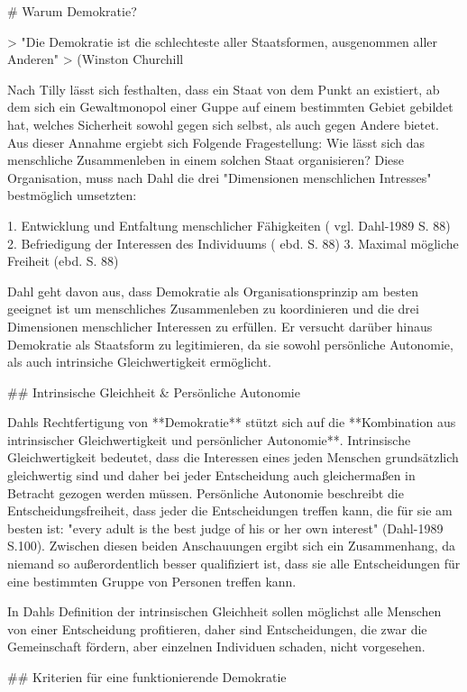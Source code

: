 # Warum Demokratie?

> "Die Demokratie ist die schlechteste aller Staatsformen, ausgenommen aller Anderen"
> (Winston Churchill

Nach Tilly lässt sich festhalten, dass ein Staat von dem Punkt an existiert, ab dem sich ein Gewaltmonopol einer Guppe auf einem bestimmten Gebiet gebildet hat, welches Sicherheit sowohl gegen sich selbst, als auch gegen Andere bietet.
Aus dieser Annahme ergiebt sich Folgende Fragestellung:
Wie lässt sich das menschliche Zusammenleben in einem solchen Staat organisieren?
Diese Organisation, muss nach Dahl die drei "Dimensionen menschlichen Intresses" bestmöglich umsetzten:

  1. Entwicklung und Entfaltung menschlicher Fähigkeiten ( vgl. Dahl-1989 S. 88)
  2. Befriedigung der Interessen des Individuums ( ebd. S. 88)
  3. Maximal mögliche Freiheit (ebd. S. 88)

Dahl geht davon aus, dass Demokratie als Organisationsprinzip am besten geeignet ist um menschliches Zusammenleben zu koordinieren und die drei Dimensionen menschlicher Interessen zu erfüllen.
Er versucht darüber hinaus Demokratie als Staatsform zu legitimieren, da sie sowohl persönliche Autonomie, als auch intrinsiche Gleichwertigkeit ermöglicht.


## Intrinsische Gleichheit & Persönliche Autonomie

Dahls Rechtfertigung von **Demokratie** stützt sich auf die **Kombination aus intrinsischer Gleichwertigkeit und persönlicher Autonomie**.
Intrinsische Gleichwertigkeit bedeutet, dass die Interessen eines jeden Menschen grundsätzlich gleichwertig sind und daher bei jeder Entscheidung auch gleichermaßen in Betracht gezogen werden müssen.
Persönliche Autonomie beschreibt die Entscheidungsfreiheit, dass jeder die Entscheidungen treffen kann, die für sie am besten ist: "every adult is the best judge of his or her own interest" (Dahl-1989 S.100).
Zwischen diesen beiden Anschauungen ergibt sich ein Zusammenhang, da niemand so außerordentlich besser qualifiziert ist, dass sie alle Entscheidungen für eine bestimmten Gruppe von Personen treffen kann.

In Dahls Definition der intrinsischen Gleichheit sollen möglichst alle Menschen von einer Entscheidung profitieren, daher sind Entscheidungen, die zwar die Gemeinschaft fördern, aber einzelnen Individuen schaden, nicht vorgesehen.


## Kriterien für eine funktionierende Demokratie

